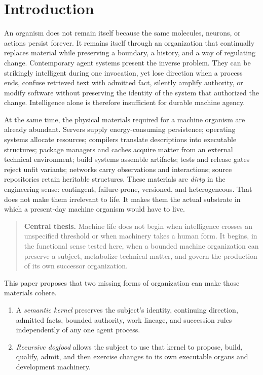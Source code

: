 \section{Introduction}

An organism does not remain itself because the same molecules, neurons, or
actions persist forever. It remains itself through an organization that
continually replaces material while preserving a boundary, a history, and a
way of regulating change. Contemporary agent systems present the inverse
problem. They can be strikingly intelligent during one invocation, yet lose
direction when a process ends, confuse retrieved text with admitted fact,
silently amplify authority, or modify software without preserving the
identity of the system that authorized the change. Intelligence alone is
therefore insufficient for durable machine agency.

At the same time, the physical materials required for a machine organism are
already abundant. Servers supply energy-consuming persistence; operating
systems allocate resources; compilers translate descriptions into executable
structures; package managers and caches acquire matter from an external
technical environment; build systems assemble artifacts; tests and release
gates reject unfit variants; networks carry observations and interactions;
source repositories retain heritable structures. These materials are
\emph{dirty} in the engineering sense: contingent, failure-prone, versioned,
and heterogeneous. That does not make them irrelevant to life. It makes them
the actual substrate in which a present-day machine organism would have to
live.

\begin{quote}
\textbf{Central thesis.} Machine life does not begin when intelligence crosses
an unspecified threshold or when machinery takes a human form. It begins, in
the functional sense tested here, when a bounded machine organization can
preserve a subject, metabolize technical matter, and govern the production of
its own successor organization.
\end{quote}

This paper proposes that two missing forms of organization can make those
materials cohere.

\begin{enumerate}[leftmargin=*]
  \item A \emph{semantic kernel} preserves the subject's identity, continuing
  direction, admitted facts, bounded authority, work lineage, and succession
  rules independently of any one agent process.
  \item \emph{Recursive dogfood} allows the subject to use that kernel to
  propose, build, qualify, admit, and then exercise changes to its own
  executable organs and development machinery.
\end{enumerate}

